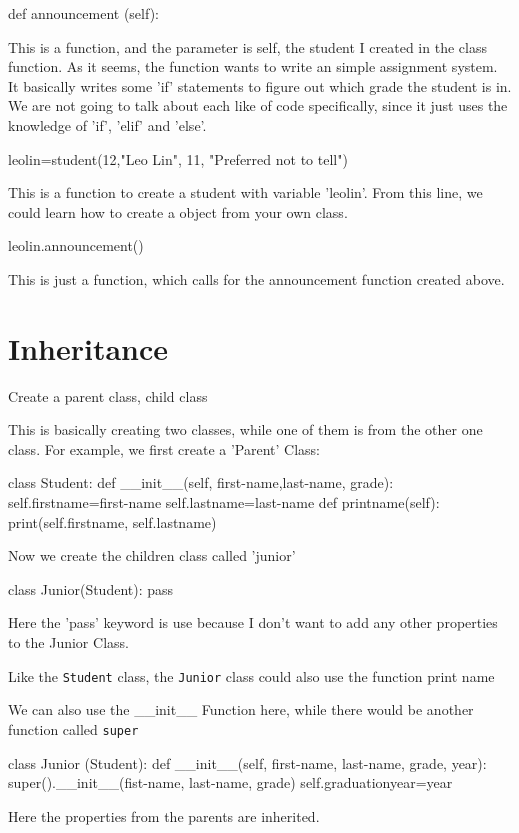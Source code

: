 \documentclass[12pt]{article}
\begin{document}
\begin{python}
	def announcement (self):
\end{python}
\par This is a function, and the parameter is self, the student I created in the class function.
As it seems, the function wants to write an simple assignment system.
It basically writes some 'if' statements to figure out which grade the student is in. We are not going to talk about each like of code specifically, since it just uses the knowledge of 'if', 'elif' and 'else'.
\begin{python}
	leolin=student(12,"Leo Lin", 11, "Preferred not to tell")
\end{python}
\par This is a function to create a student with variable 'leolin'.
From this line, we could learn how to create a object from your own class.
\begin{python}
	leolin.announcement()
\end{python}
This is just a function, which calls for the announcement function created above.
\section{Inheritance}
Create a parent class, child class
\par This is basically creating two classes, while one of them is from the other one class.
For example, we first create a 'Parent' Class:
\begin{python}
  class Student:
    def __init__(self, first-name,last-name, grade):
      self.firstname=first-name
      self.lastname=last-name
    def printname(self):
		 print(self.firstname, self.lastname)
\end{python}
\par Now we create the children class called 'junior'
\begin{python}
	class Junior(Student):
		pass
\end{python}
\par Here the 'pass' keyword is use because I don't want to add any other properties to the Junior Class.
\par Like the \texttt{Student} class, the \texttt{Junior} class could also use the function print name
\par We can also use the \_\_init\_\_ Function here, while there would be another function called \texttt{super}
\begin{python}
	class Junior (Student):
		def __init__(self, first-name, last-name, grade, year):
		super().__init__(fist-name, last-name, grade)
		self.graduationyear=year
\end{python}
\par Here the properties from the parents are inherited.
\end{document}
